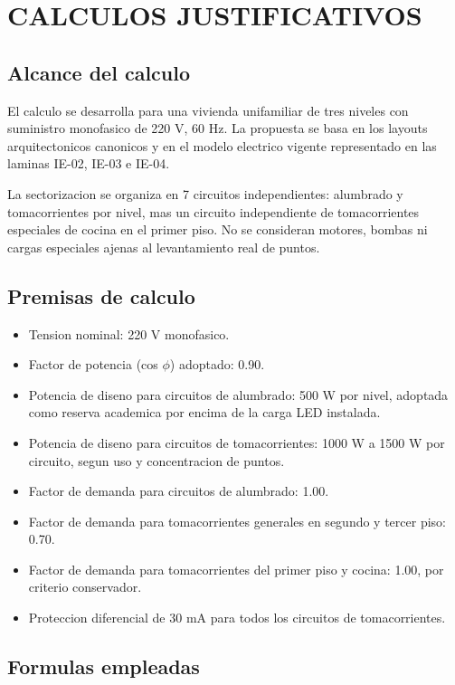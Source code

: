 \chapter{CALCULOS JUSTIFICATIVOS}

\section{Alcance del calculo}

El calculo se desarrolla para una vivienda unifamiliar de tres niveles con suministro monofasico de 220 V, 60 Hz. La propuesta se basa en los layouts arquitectonicos canonicos y en el modelo electrico vigente representado en las laminas IE-02, IE-03 e IE-04.

La sectorizacion se organiza en 7 circuitos independientes: alumbrado y tomacorrientes por nivel, mas un circuito independiente de tomacorrientes especiales de cocina en el primer piso. No se consideran motores, bombas ni cargas especiales ajenas al levantamiento real de puntos.

\section{Premisas de calculo}

\begin{itemize}
  \item Tension nominal: 220 V monofasico.
  \item Factor de potencia (cos $\phi$) adoptado: 0.90.
  \item Potencia de diseno para circuitos de alumbrado: 500 W por nivel, adoptada como reserva academica por encima de la carga LED instalada.
  \item Potencia de diseno para circuitos de tomacorrientes: 1000 W a 1500 W por circuito, segun uso y concentracion de puntos.
  \item Factor de demanda para circuitos de alumbrado: 1.00.
  \item Factor de demanda para tomacorrientes generales en segundo y tercer piso: 0.70.
  \item Factor de demanda para tomacorrientes del primer piso y cocina: 1.00, por criterio conservador.
  \item Proteccion diferencial de 30 mA para todos los circuitos de tomacorrientes.
\end{itemize}

\section{Formulas empleadas}

